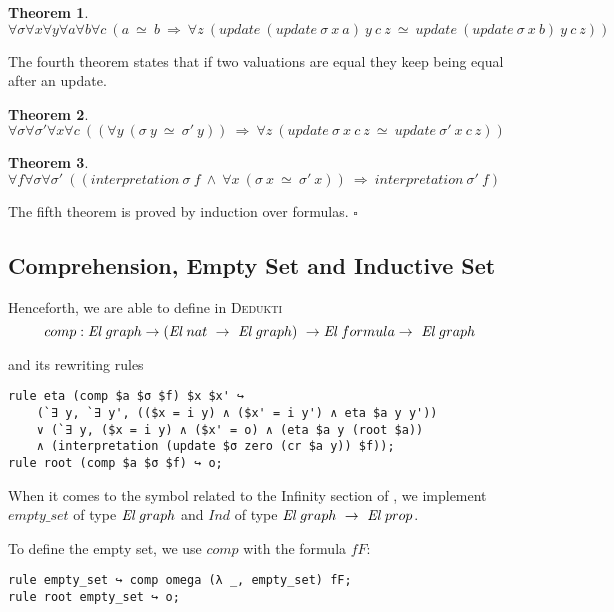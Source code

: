 \documentclass[submission,copyright,creativecommons]{eptcs}
\def\ra{\rightarrow}
\def\El{{\mbox{\it El}}}
\def\imp{\mathbin{\Rightarrow}}
\def\fa{{\forall}}
\def\conj{\mathbin{\wedge}}
\newtheorem{theorem}{Theorem}[section]
\newenvironment{proof}{\noindent {\em Proof.}}{\medskip}
\newcommand{\dedukti}{\textsc{Dedukti}}
\begin{document}
\begin{theorem}
$\fa \sigma \fa x \fa y \fa a \fa b \fa c ~(a \ \simeq \ b \ \imp \ \fa z~ (update \ (update \ \sigma \ x \ a) \ y \ c \ z \ \simeq \ update \  (update \ \sigma \ x \ b) \ y \ c \ z))$
\end{theorem}

The fourth theorem states that if two valuations are equal they keep being equal after an update.

\begin{theorem}
$\fa \sigma \fa \sigma' \fa x \fa c~ ((\fa y~ (\sigma \ y \ \simeq \ \sigma' \ y)) \ \imp \ \fa z~ (update \ \sigma \ x \ c \ z \ \simeq \ update \ \sigma' \ x \ c \ z))$
\end{theorem}

\begin{theorem}
$\fa f \fa \sigma \fa \sigma' ~((interpretation \ \sigma \ f \ \conj \ \fa x ~(\sigma \ x \ \simeq \ \sigma' \ x)) \ \imp \ interpretation \ \sigma' \ f)$
\end{theorem}

\begin{proof}
The fifth theorem is proved by induction over formulas. $\square$
\end{proof}

\subsection{Comprehension, Empty Set and Inductive Set}

Henceforth, we are able to define in \dedukti
$$comp : \El~graph \ra (\El \ nat \ \ra \ \El~graph) \  \ra \El \ formula \ra \ \El~graph$$

and its rewriting rules

\begin{lstlisting}
rule eta (comp $a $σ $f) $x $x' ↪ 
	(`∃ y, `∃ y', (($x = i y) ∧ ($x' = i y') ∧ eta $a y y')) 
	∨ (`∃ y, ($x = i y) ∧ ($x' = o) ∧ (eta $a y (root $a))
	∧ (interpretation (update $σ zero (cr $a y)) $f));
rule root (comp $a $σ $f) ↪ o;
\end{lstlisting}

When it comes to the symbol related to the Infinity section of \cite[see Section 2.1]{zermodulo}, we implement $empty\_set$ of type $\El~graph$ and $Ind$ of type $\El~graph \ \ra \ \El~prop$.

To define the empty set, we use $comp$ with the formula $fF$:
\begin{lstlisting}
rule empty_set ↪ comp omega (λ _, empty_set) fF;
rule root empty_set ↪ o;
\end{lstlisting}
\end{document}
